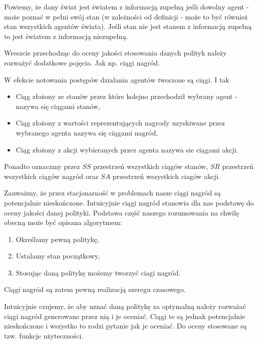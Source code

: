 \documentclass[10pt,a4paper]{book}
\begin{document}
\begin{definition}
Powiemy, że dany świat jest światem z informacją zupełną jeśli dowolny agent - może poznać w pełni swój stan (w zależności od definicji - może to być również stan wszystkich agentów świata). Jeśli stan nie jest stanem z informacją zupełną to jest światem z informacją niezupełną. 
\end{definition}

Wreszcie przechodząc do oceny jakości stosowania danych polityk należy rozważyć dodatkowe pojęcia. Jak np. ciągi nagród.

\begin{definition}
W efekcie notowania postępów działania agentów tworzone są ciągi.
I tak
\begin{itemize}
\item Ciąg złożony ze stanów przez które kolejno przechodził wybrany agent - nazywa się ciągami stanów,
\item Ciąg złożony z wartości reprezentujących nagrody uzyskiwane przez wybranego agenta nazywa się ciągami nagród,
\item Ciąg złożony z akcji wybieranych przez agenta nazywa sie ciągami akcji.
\end{itemize}
Ponadto oznaczmy przez $SS$ przestrzeń wszystkich ciągów stanów, $SR$ przestrzeń wszystkich ciągów nagród oraz $SA$ przestrzeń wszystkich ciagów akcji.
\end{definition}

Zauważmy, że przez stacjonarność w problemach nasze ciągi nagród są potencjalnie nieskończone. Intuicyjnie ciągi nagród stanowia dla nas podstawę do oceny jakości danej polityki. Podstawa część naszego rozumowania na chwilę obecną może być opisana algorytmem:

\begin{enumerate}
\item Określamy pewną politykę, 
\item Ustalamy stan początkowy,
\item Stosując daną politykę możemy tworzyć ciagi nagród.
\end{enumerate}


\begin{remark*}
Ciągi nagród są zatem pewną realizacją szeregu czasowego.
\end{remark*}

Intuicyjnie czujemy, że aby uznać daną politykę za optymalną należy rozważać ciągi nagród generowane przez nią i je oceniać. Ciągi te są jednak potencjalnie nieskończone i wszystko to rodzi pytanie jak je oceniać. Do oceny stosowane są tzw. funkcje użyteczności.
\end{document}
